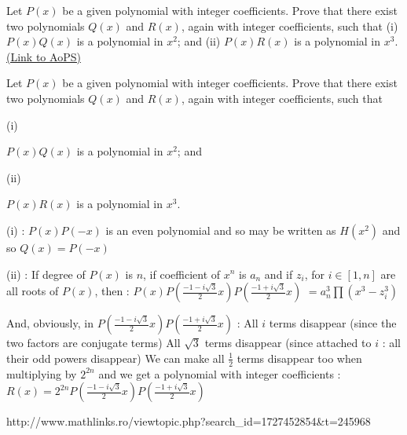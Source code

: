 \begin{problem}
	Let $ P(x)$ be a given polynomial with integer coefficients. Prove that there exist two polynomials $ Q(x)$ and $ R(x)$, again with integer coefficients, such that (i) $ P(x)Q(x)$ is a polynomial in $ x^{2}$; and (ii) $ P(x)R(x)$ is a polynomial in $ x^{3}$.
	\flushright \href{https://artofproblemsolving.com/community/c6h298820}{(Link to AoPS)}
\end{problem}



\begin{solution}
	\begin{tcolorbox}Let $ P(x)$ be a given polynomial with integer coefficients. Prove that there exist two polynomials $ Q(x)$ and $ R(x)$, again with integer coefficients, such that \begin{bolded}(i)\end{bolded} $ P(x)Q(x)$ is a polynomial in $ x^{2}$; and \begin{bolded}(ii)\end{bolded} $ P(x)R(x)$ is a polynomial in $ x^{3}$.\end{tcolorbox}

(i) : $ P(x)P(-x)$ is an even polynomial and so may be written as $ H(x^2)$ and so $ \boxed{Q(x)=P(-x)}$

(ii) : If degree of $ P(x)$ is $ n$, if coefficient of $ x^n$ is $ a_n$ and if $ z_i$, for $ i\in[1,n]$ are all roots of $ P(x)$, then :
$ P(x)P(\frac{-1-i\sqrt 3}2x)P(\frac{-1+i\sqrt 3}2x)$ $ =a_n^3\prod(x^3-z_i^3)$

And, obviously, in $ P(\frac{-1-i\sqrt 3}2x)P(\frac{-1+i\sqrt 3}2x)$ :
All $ i$ terms disappear (since the two factors are conjugate terms)
All $ \sqrt 3$ terms disappear (since attached to $ i$ : all their odd powers disappear)
We can make all $ \frac 12$ terms disappear too when multiplying by $ 2^{2n}$ and we get a polynomial with integer coefficients : $ \boxed{R(x)=2^{2n}P(\frac{-1-i\sqrt 3}2x)P(\frac{-1+i\sqrt 3}2x)}$
\end{solution}



\begin{solution}
	http://www.mathlinks.ro/viewtopic.php?search_id=1727452854&t=245968
\end{solution}



